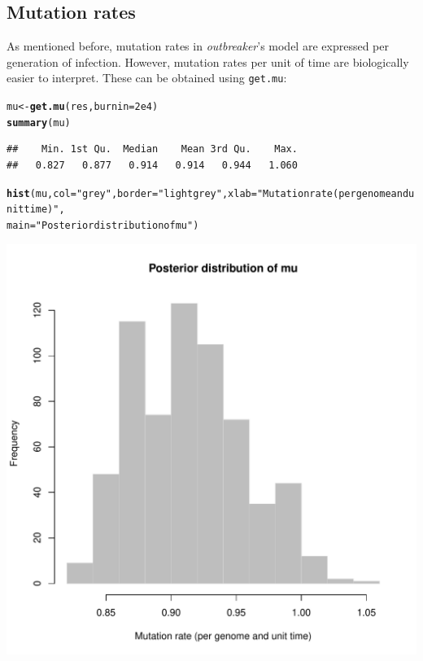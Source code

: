 \documentclass{article}\usepackage[]{graphicx}\usepackage[]{color}
\makeatletter
\newcommand{\hlnum}[1]{\textcolor[rgb]{0.686,0.059,0.569}{#1}}%
\newcommand{\hlstr}[1]{\textcolor[rgb]{0.192,0.494,0.8}{#1}}%
\newcommand{\hlstd}[1]{\textcolor[rgb]{0.345,0.345,0.345}{#1}}%
\newcommand{\hlkwb}[1]{\textcolor[rgb]{0.69,0.353,0.396}{#1}}%
\newcommand{\hlkwc}[1]{\textcolor[rgb]{0.333,0.667,0.333}{#1}}%
\newcommand{\hlkwd}[1]{\textcolor[rgb]{0.737,0.353,0.396}{\textbf{#1}}}%
\newenvironment{kframe}{%
 \def\at@end@of@kframe{}%
 \ifinner\ifhmode%
  \def\at@end@of@kframe{\end{minipage}}%
  \begin{minipage}{\columnwidth}%
 \fi\fi%
 \def\FrameCommand##1{\hskip\@totalleftmargin \hskip-\fboxsep
 \colorbox{shadecolor}{##1}\hskip-\fboxsep
     \hskip-\linewidth \hskip-\@totalleftmargin \hskip\columnwidth}%
 \MakeFramed {\advance\hsize-\width
   \@totalleftmargin\z@ \linewidth\hsize
   \@setminipage}}%
 {\par\unskip\endMakeFramed%
 \at@end@of@kframe}
\newenvironment{knitrout}{}{} %
\makeatother
\begin{document}
\subsection{Mutation rates}
As mentioned before, mutation rates in \textit{outbreaker}'s model are expressed per generation of infection.
However, mutation rates per unit of time are biologically easier to interpret.
These can be obtained using \texttt{get.mu}:
\begin{knitrout}
\color{fgcolor}\begin{kframe}
\begin{alltt}
\hlstd{mu} \hlkwb{<-} \hlkwd{get.mu}\hlstd{(res,} \hlkwc{burnin}\hlstd{=}\hlnum{2e4}\hlstd{)}
\hlkwd{summary}\hlstd{(mu)}
\end{alltt}
\begin{verbatim}
##    Min. 1st Qu.  Median    Mean 3rd Qu.    Max. 
##   0.827   0.877   0.914   0.914   0.944   1.060
\end{verbatim}
\begin{alltt}
\hlkwd{hist}\hlstd{(mu,} \hlkwc{col}\hlstd{=}\hlstr{"grey"}\hlstd{,}\hlkwc{border}\hlstd{=}\hlstr{"lightgrey"}\hlstd{,} \hlkwc{xlab}\hlstd{=}\hlstr{"Mutation rate (per genome and unit time)"}\hlstd{,}
     \hlkwc{main}\hlstd{=}\hlstr{"Posterior distribution of mu"}\hlstd{)}
\end{alltt}
\end{kframe}

{\centering \includegraphics[width=.6\textwidth]{figs/unnamed-chunk-42} 

}



\end{knitrout}
\end{document}
